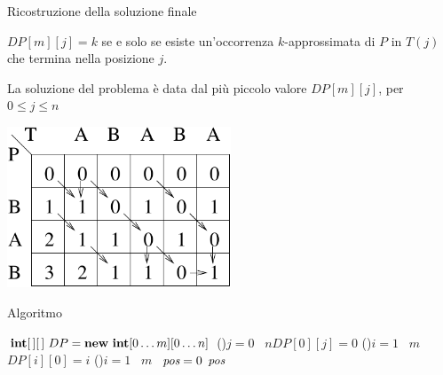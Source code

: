 \begin{frame}{Ricostruzione della soluzione finale}

\vspace{-6pt}
\BIL
\item $DP[m][j] = k$ se e solo se esiste un'occorrenza $k$-approssimata di $P$ in $T(j)$ che
termina nella posizione $j$.
\item La soluzione del problema è data dal più piccolo valore $DP[m][j]$, per $0 \leq j \leq n$
\EIL

\begin{center}
\includegraphics[width=0.5\textwidth]{stringmatching2.pdf}
\end{center}

\end{frame}

\begin{frame}{Algoritmo}

\small
\vspace{-6pt}
\begin{Procedure}
\caption[A]{\INTEGER\ \stringmatching($\Item[\,]\ P,\ \Item[\,]\ T,\ \INTEGER\ m,\ \INTEGER\ n$)}

$\INTARRAY[\,]\ DP = \NEW\ \INTEGER[0 \mldots m][ 0 \mldots n]$\;
\lFor(){$j = 0$ \TO\ $n$}{$DP[0][j] = 0$}
\lFor(){$i = 1$ \TO\ $m$}{$DP[i][0] = i$}
\For(){$i = 1$ \TO\ $m$}{
}
\INTEGER\ $\textit{pos} = 0$
\Return $\textit{pos}$\;
\end{Procedure}

\end{frame}

